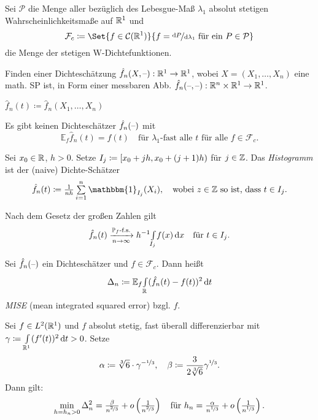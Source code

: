 \documentclass{cheat-sheet}
\renewcommand{\P}{\mathbb{P}} %
\newcommand{\E}{\mathbb{E}} %
\newcommand{\ind}{\mathbbm{1}} %
\newcommand{\Cont}{\mathcal{C}} %
\begin{document}

\begin{nota}
  Sei $\mathcal{P}$ die Menge aller bezüglich des Lebesgue-Maß $\lambda_1$ absolut stetigen Wahrscheinlichkeitsmaße auf $\mathbb{R}^1$ und
  \[ \mathcal{F}_c \coloneqq \Set{f \in \Cont(\R^1)}{f = \nicefrac{\d P}{\d \lambda_1} \text{ für ein } P \in \mathcal{P}} \]
  die Menge der stetigen W-Dichtefunktionen.
\end{nota}

\begin{ziel}
  Finden einer Dichteschätzung $\hat{f}_n(X, \text{--}) : \mathbb{R}^1 \to \mathbb{R}^1$, wobei $X = (X_1, \ldots, X_n)$ eine math. SP ist, in Form einer messbaren Abb. $\hat{f}_n(\text{--}, \text{--}) : \mathbb{R}^n \times \mathbb{R}^1 \to \mathbb{R}^1$.
\end{ziel}

\begin{nota}
  $\hat{f}_n(t) \coloneqq \hat{f}_n(X_1, \ldots, X_n)$
\end{nota}

\begin{lem}
  Es gibt keinen Dichteschätzer $\hat{f}_n(\text{--})$ mit
  \[
    \E_f \hat{f}_n(t) = f(t) \quad
    \text{für $\lambda_1$-fast alle $t$ für alle $f \in \mathcal{F}_c$.}
  \]
\end{lem}

\begin{defn}
  Sei $x_0 \in \mathbb{R}$, $h > 0$.
  Setze $I_j \coloneqq \left[ x_0 + jh, x_0 + (j+1) h \right)$ für $j \in \mathbb{Z}$.
  Das \emph{Histogramm} ist der (naive) Dichte-Schätzer
  \[
    \hat{f}_n(t) \coloneqq \tfrac{1}{nh} \sum_{i=1}^n \ind_{I_j}(X_i), \quad
    \text{wobei $z \in \Z$ so ist, dass $t \in I_j$}.
  \]
\end{defn}

\begin{bem}
  Nach dem Gesetz der großen Zahlen gilt
  \[
    \hat{f}_n(t) \xra[n \to \infty]{\text{$\P_f$-f.s.}}
    h^{-1} \Int{I_j}{}{f(x)}{x} \quad
    \text{für $t \in I_j$.}
  \]
\end{bem}

\begin{defn}
  Sei $\hat{f}_n(\text{--})$ ein Dichteschätzer und $f \in \mathcal{F}_c$.
  Dann heißt
  \[
    \Delta_n \coloneqq \E_f \Int{\R}{}{(\hat{f}_n(t) - f(t))^2}{t}
  \]
  \emph{MISE} (mean integrated squared error) bzgl. $f$.
\end{defn}

\begin{satz}
  Sei $f \in L^2(\mathbb{R}^1)$ und $f$ absolut stetig, \dh{} fast überall differenzierbar mit $\gamma \coloneqq {\textstyle \int\limits_{\mathbb{R}^1}^{}} (f'(t))^2 \,\mathrm{d} t > 0$.
  Setze
  \[
    \alpha \coloneqq \sqrt[3]{6} \cdot \gamma^{- \nicefrac{1}{3}}, \quad
    \beta \coloneqq \frac{3}{2 \sqrt[3]{6}} \gamma^{\nicefrac{1}{3}}.
  \]
  Dann gilt:
  \[
    \min_{h = h_n > 0} \Delta_n^2 = \tfrac{\beta}{n^{\nicefrac{2}{3}}} + o \left( \tfrac{1}{n^{\nicefrac{2}{3}}} \right) \quad
    \text{für }
    h_n = \tfrac{\alpha}{n^{\nicefrac{1}{3}}} + o \left( \tfrac{1}{n^{\nicefrac{1}{3}}} \right).
  \]
\end{satz}
\end{document}
